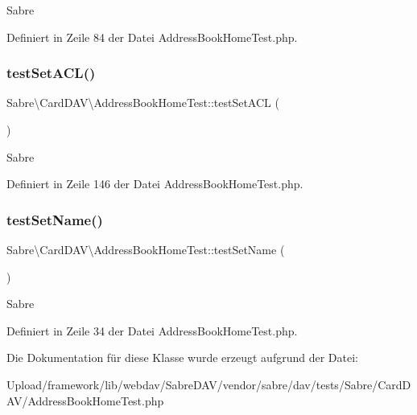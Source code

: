 Sabre 

Definiert in Zeile 84 der Datei Address\+Book\+Home\+Test.\+php.

\mbox{\label{class_sabre_1_1_card_d_a_v_1_1_address_book_home_test_abfb7a825b347f0bd7d0af6ba4ae63881}} 
\subsubsection{\texorpdfstring{test\+Set\+A\+C\+L()}{testSetACL()}}
{\footnotesize\ttfamily Sabre\textbackslash{}\+Card\+D\+A\+V\textbackslash{}\+Address\+Book\+Home\+Test\+::test\+Set\+A\+CL (\begin{DoxyParamCaption}{ }\end{DoxyParamCaption})}

Sabre 

Definiert in Zeile 146 der Datei Address\+Book\+Home\+Test.\+php.

\mbox{\label{class_sabre_1_1_card_d_a_v_1_1_address_book_home_test_aaca906e3648aa481f0408bfef3cf84e7}} 
\subsubsection{\texorpdfstring{test\+Set\+Name()}{testSetName()}}
{\footnotesize\ttfamily Sabre\textbackslash{}\+Card\+D\+A\+V\textbackslash{}\+Address\+Book\+Home\+Test\+::test\+Set\+Name (\begin{DoxyParamCaption}{ }\end{DoxyParamCaption})}

Sabre 

Definiert in Zeile 34 der Datei Address\+Book\+Home\+Test.\+php.



Die Dokumentation für diese Klasse wurde erzeugt aufgrund der Datei\+:\begin{DoxyCompactItemize}
\item 
Upload/framework/lib/webdav/\+Sabre\+D\+A\+V/vendor/sabre/dav/tests/\+Sabre/\+Card\+D\+A\+V/Address\+Book\+Home\+Test.\+php\end{DoxyCompactItemize}
